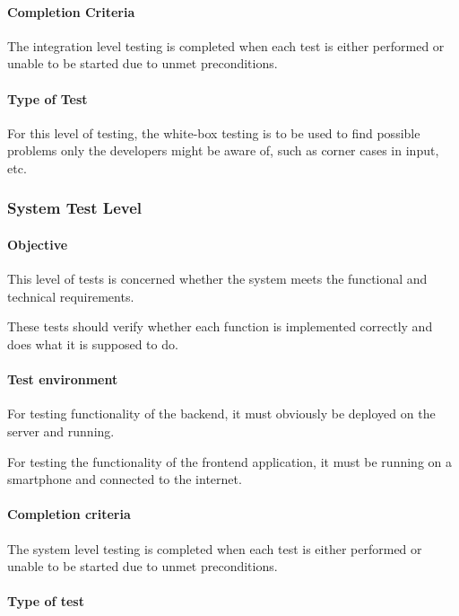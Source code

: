 \documentclass[11pt]{book}
\begin{document}
\paragraph{Completion Criteria}

The integration level testing is completed when each test is either performed or unable to be started due to unmet preconditions.

\paragraph{Type of Test}

For this level of testing, the white-box testing is to be used to find possible problems only the developers might be aware of, such as corner cases in input, etc.


\subsubsection{System Test Level}

\paragraph{Objective}

This level of tests is concerned whether the system meets the functional and technical requirements.

These tests should verify whether each function is implemented correctly and does what it is supposed to do.

\paragraph{Test environment}

For testing functionality of the backend, it must obviously be deployed on the server and running.

For testing the functionality of the frontend application, it must be running on a smartphone and connected to the internet.

\paragraph{Completion criteria}

The system level testing is completed when each test is either performed or unable to be started due to unmet preconditions.

\paragraph{Type of test}
\end{document}
